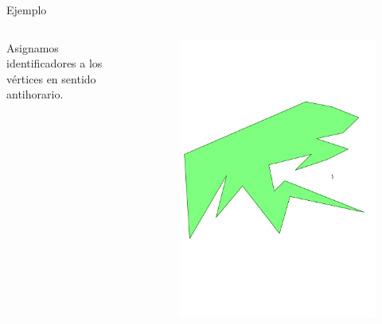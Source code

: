 \documentclass[aspectratio=169,xcolor=dvipsnames, t]{beamer}
\begin{document}
\begin{frame}{Ejemplo}
  \begin{columns}
    \begin{column}{0.3\textwidth}
      \raggedright %
      Asignamos identificadores a los vértices en sentido antihorario.
    \end{column}
    \begin{column}{0.7\textwidth}
      \vspace{-2.5cm} %
      \begin{figure}
        \centering
        \includegraphics[width=1\linewidth, height=.95\textheight, page=8, keepaspectratio]{IPE/point_visibility.pdf}
      \end{figure}
    \end{column}
  \end{columns}
\end{frame}
\end{document}

